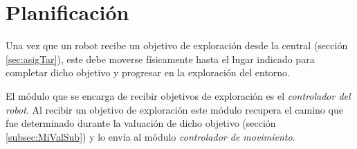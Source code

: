 


\section{Planificación}\label{sec:miNav}



Una vez que un robot recibe un objetivo de exploración desde la central
(sección \ref{sec:asigTar}), este debe moverse físicamente hasta el lugar
indicado para completar dicho objetivo y progresar en la exploración del entorno.

El módulo que se encarga de recibir objetivos de exploración es el
\emph{controlador del robot}. Al recibir un objetivo de exploración este módulo
recupera el camino que fue determinado durante la valuación de dicho objetivo
(sección \ref{subsec:MiValSub}) y lo envía al módulo \emph{controlador de
movimiento}. 




